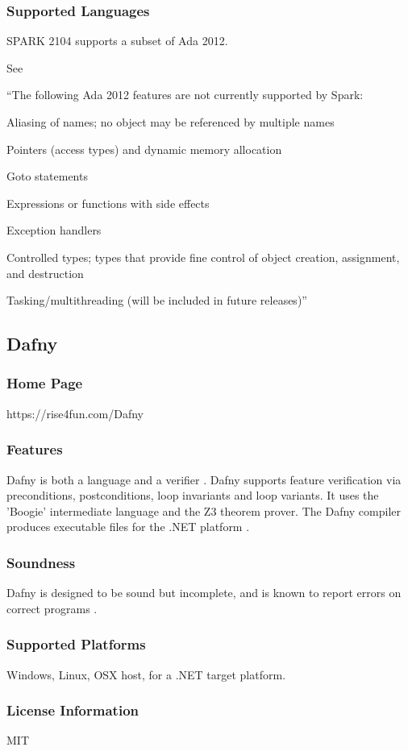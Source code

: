 \documentclass[11pt]{article}
\begin{document}
	\subsubsection{Supported Languages}
	SPARK 2104 supports a subset of Ada 2012.


	See \cite[p.18]{McCormickJohnW.2015Bhia}

	``The following Ada 2012 features are not currently supported by Spark:

	Aliasing of names; no object may be referenced by multiple names

	Pointers (access types) and dynamic memory allocation

	Goto statements

	Expressions or functions with side effects

	Exception handlers

	Controlled types; types that provide fine control of object creation, assignment, and destruction

	Tasking/multithreading (will be included in future releases)''
	
\subsection{Dafny}
	\subsubsection{Home Page}%
		https://rise4fun.com/Dafny
	\subsubsection{Features}
		Dafny is both a language and a verifier \cite{LeinoK.R.M.2010DAap}. Dafny supports feature verification via preconditions, postconditions, loop invariants and loop variants. It uses the 'Boogie' intermediate language and the Z3 theorem prover. The Dafny compiler produces executable files for the .NET platform \cite{dafny02}.
	\subsubsection{Soundness}
		Dafny is designed to be sound but incomplete, and is known to report errors on correct programs \cite{dafny01}.
	\subsubsection{Supported Platforms}
		Windows, Linux, OSX host, for a .NET target platform.
	\subsubsection{License Information}
		MIT
\end{document}
